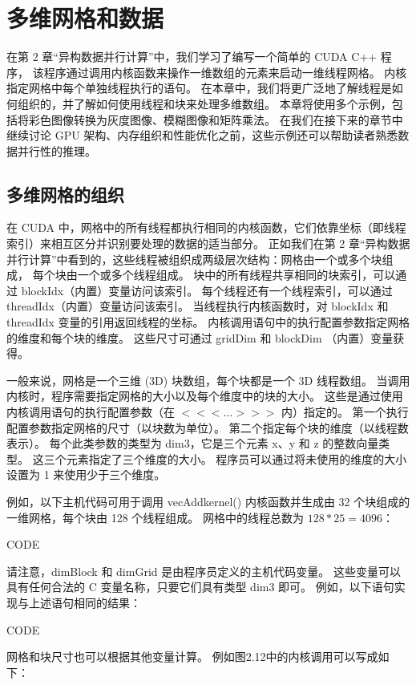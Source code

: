 \section{多维网格和数据}
在第 2 章“异构数据并行计算”中，我们学习了编写一个简单的 CUDA C++ 程序，
该程序通过调用内核函数来操作一维数组的元素来启动一维线程网格。 内核指定网格中每个单独线程执行的语句。 
在本章中，我们将更广泛地了解线程是如何组织的，并了解如何使用线程和块来处理多维数组。 
本章将使用多个示例，包括将彩色图像转换为灰度图像、模糊图像和矩阵乘法。 
在我们在接下来的章节中继续讨论 GPU 架构、内存组织和性能优化之前，这些示例还可以帮助读者熟悉数据并行性的推理。

\subsection{多维网格的组织}
在 CUDA 中，网格中的所有线程都执行相同的内核函数，它们依靠坐标（即线程索引）来相互区分并识别要处理的数据的适当部分。 
正如我们在第 2 章“异构数据并行计算”中看到的，这些线程被组织成两级层次结构：网格由一个或多个块组成，
每个块由一个或多个线程组成。 块中的所有线程共享相同的块索引，可以通过 blockIdx（内置）变量访问该索引。 
每个线程还有一个线程索引，可以通过 threadIdx（内置）变量访问该索引。 
当线程执行内核函数时，对 blockIdx 和 threadIdx 变量的引用返回线程的坐标。 
内核调用语句中的执行配置参数指定网格的维度和每个块的维度。 这些尺寸可通过 gridDim 和 blockDim （内置）变量获得。

一般来说，网格是一个三维 (3D) 块数组，每个块都是一个 3D 线程数组。 
当调用内核时，程序需要指定网格的大小以及每个维度中的块的大小。 
这些是通过使用内核调用语句的执行配置参数（在 $<<<...>>>$ 内）指定的。 
第一个执行配置参数指定网格的尺寸（以块数为单位）。 第二个指定每个块的维度（以线程数表示）。 
每个此类参数的类型为 dim3，它是三个元素 x、y 和 z 的整数向量类型。 
这三个元素指定了三个维度的大小。 程序员可以通过将未使用的维度的大小设置为 1 来使用少于三个维度。

例如，以下主机代码可用于调用 vecAddkernel() 内核函数并生成由 32 个块组成的一维网格，每个块由 128 个线程组成。 
网格中的线程总数为 $128 * 25 = 4096$：

{\color{red} CODE}

请注意，dimBlock 和 dimGrid 是由程序员定义的主机代码变量。 
这些变量可以具有任何合法的 C 变量名称，只要它们具有类型 dim3 即可。 例如，以下语句实现与上述语句相同的结果：

{\color{red} CODE}

网格和块尺寸也可以根据其他变量计算。 例如图2.12中的内核调用可以写成如下：

